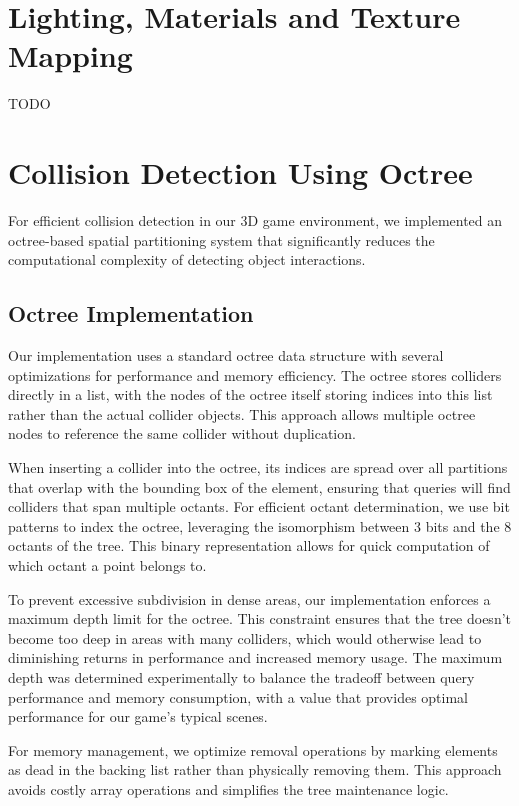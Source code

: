 \documentclass{article}
\begin{document}
\section{Lighting, Materials and Texture Mapping}
TODO

\section{Collision Detection Using Octree}

For efficient collision detection in our 3D game environment, we implemented an octree-based spatial partitioning system that significantly reduces the computational complexity of detecting object interactions.

\subsection{Octree Implementation}
Our implementation uses a standard octree data structure with several
optimizations for performance and memory efficiency. The octree stores
colliders directly in a list, with the nodes of the octree itself storing
indices into this list rather than the actual collider objects. This approach
allows multiple octree nodes to reference the same collider without
duplication.

When inserting a collider into the octree, its indices are spread over all
partitions that overlap with the bounding box of the element, ensuring that
queries will find colliders that span multiple octants. For efficient octant
determination, we use bit patterns to index the octree, leveraging the
isomorphism between 3 bits and the 8 octants of the tree. This binary
representation allows for quick computation of which octant a point belongs to.

To prevent excessive subdivision in dense areas, our implementation enforces a maximum depth limit for the octree. This constraint ensures that the tree doesn't become too deep in areas with many colliders, which would otherwise lead to diminishing returns in performance and increased memory usage. The maximum depth was determined experimentally to balance the tradeoff between query performance and memory consumption, with a value that provides optimal performance for our game's typical scenes.

For memory management, we optimize removal operations by marking elements as
dead in the backing list rather than physically removing them. This approach
avoids costly array operations and simplifies the tree maintenance logic.
\end{document}
